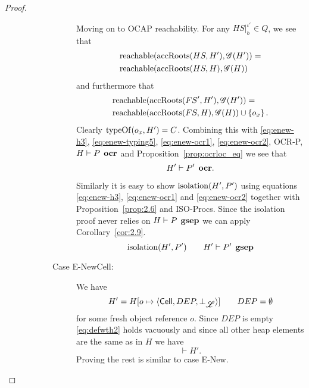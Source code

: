\begin{proof}
\begin{description}
\begin{description}
\begin{description}
              Moving on to OCAP reachability. For any $HS|_b^{\iota'} \in Q$,
              we see that
              \begin{equation} \label{eq:enew-ocr1}
                \begin{aligned}
                  &\mbox{$\mathrm{reachable}$}(\mbox{$\mathrm{accRoots}$}(HS, H'), \mathscr{G}(H')) = \\
                  &\mbox{$\mathrm{reachable}$}(\mbox{$\mathrm{accRoots}$}(HS, H), \mathscr{G}(H)) 
                \end{aligned}
              \end{equation}
              and furthermore that
              \begin{equation} \label{eq:enew-ocr2}
                \begin{aligned}
                  &\mbox{$\mathrm{reachable}$}(\mbox{$\mathrm{accRoots}$}(FS', H'), \mathscr{G}(H')) = \\
                  &\mbox{$\mathrm{reachable}$}(\mbox{$\mathrm{accRoots}$}(FS, H), \mathscr{G}(H)) \cup \left\{ o_x
                  \right\}.
                \end{aligned}
              \end{equation}
              Clearly $\mbox{$\mathrm{typeOf}$}(o_x, H') = C$. Combining this with
              \eqref{eq:enew-h3}, \eqref{eq:enew-typing5}, \eqref{eq:enew-ocr1},
              \eqref{eq:enew-ocr2}, {\sc OCR-P}, $H \vdash P \:\: \mbox{\bf ocr}$ and
              Proposition~\ref{prop:ocrloc_eq} we see that
              \begin{equation}
                H' \vdash P' \:\: \mbox{\bf ocr}.
              \end{equation}

              Similarly it is easy to show $\mbox{$\mathrm{isolation}$}(H', P')$ using equations
              \eqref{eq:enew-h3}, \eqref{eq:enew-ocr1} and \eqref{eq:enew-ocr2}
              together with Proposition~\ref{prop:2.6} and {\sc ISO-Procs}.
              Since the isolation proof never relies on $H \vdash P \:\: \mbox{\bf gsep}$
              we can apply Corollary~\ref{cor:2.9}.
              \begin{equation}
                \mbox{$\mathrm{isolation}$}(H', P') \quad\quad H' \vdash P' \:\: \mbox{\bf gsep}
              \end{equation}

            \item[Case {\sc E-NewCell}:] We have
              \begin{equation}
                H' = H[o \mapsto \mbox{$\langle \mbox{$\mathsf{Cell}$}{}, DEP, \bot_{\mbox{$\mathscr{L}$}} \rangle$}] \quad\quad DEP = \emptyset
              \end{equation}
              for some fresh object reference $o$. 
              Since $DEP$ is empty \eqref{eq:defwth2} holds vacuously and since
              all other heap elements are the same as in $H$ we have
              \begin{equation}
                \vdash H'.
              \end{equation}
              Proving the rest is similar to case {\sc E-New}.


\end{description}
\end{description}
\end{description}
\end{proof}
